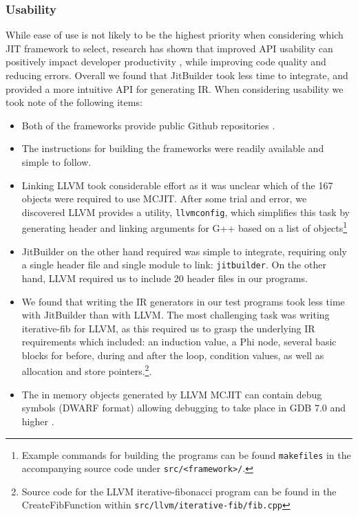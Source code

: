\subsubsection{Usability}
While ease of use is not likely to be the highest priority when considering which JIT framework to select, research has shown that improved API usability can positively impact developer productivity \cite{apiUsability}, while improving code quality and reducing errors.
Overall we found that JitBuilder took less time to integrate, and provided a more intuitive API for generating IR.
When considering usability we took note of the following items:
\begin{itemize}
  \item Both of the frameworks provide public Github repositories \cite{llvmGithub,jitbuilderGithub}.
  \item The instructions for building the frameworks were readily available and simple to follow.
  \item Linking LLVM took considerable effort as it was unclear which of the 167 objects were required to use MCJIT. After some trial and error, we discovered LLVM provides a utility, \texttt{llvmconfig}, which simplifies this task by generating header and linking arguments for G++ based on a list of objects\footnote{Example commands for building the programs can be found \texttt{makefiles} in the accompanying source code \cite{projectGithub} under \texttt{src/<framework>/}.} 
  \item JitBuilder on the other hand required was simple to integrate, requiring only a single header file and single module to link: \texttt{jitbuilder}. On the other hand, LLVM required us to include 20 header files in our programs.
  \item We found that writing the IR generators in our test programs took less time with JitBuilder than with LLVM. 
  The most challenging task was writing iterative-fib for LLVM, as this required us to grasp the underlying IR requirements which included: an induction value, a Phi node, several basic blocks for before, during and after the loop, condition values, as well as allocation and store pointers.\footnote{Source code for the LLVM iterative-fibonacci program can be found in the CreateFibFunction within \texttt{src/llvm/iterative-fib/fib.cpp}}.
  \item The in memory objects generated by LLVM MCJIT can contain debug symbols (DWARF format) allowing debugging to take place in GDB 7.0 and higher \cite{llvmDebugJIT}.
\end{itemize}

